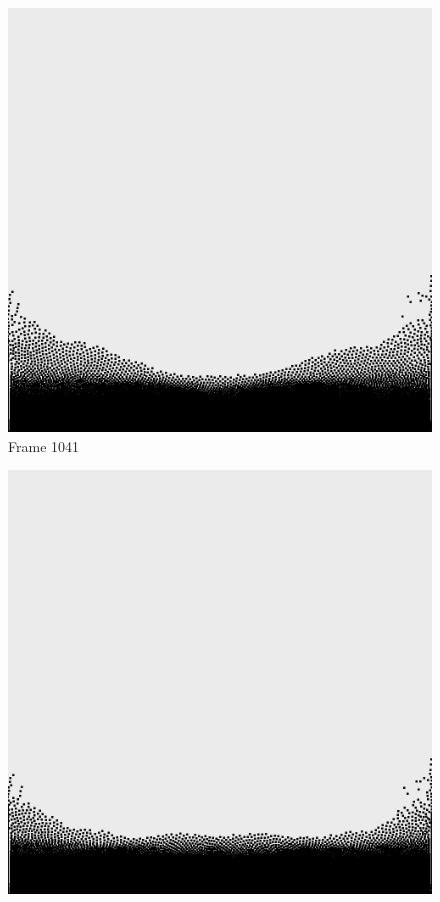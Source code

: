 \documentclass[a4paper, 12pt, oneside]{book}
\begin{document}
\begin{figure}[!ht]
    \addvspace{0.5ex}
        \begin{center}
            \includegraphics[width=\linewidth]{images/test_case_1/1041.png}
            Frame 1041
        \end{center}
    \endminipage
    \hfill
        \begin{center}
            \includegraphics[width=\linewidth]{images/test_case_1/1061.png}

\end{center}
\end{figure}
\end{document}
